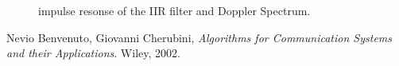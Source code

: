 \documentclass[a4paper, 12pt]{report}
\begin{document}

\begin{figure}[h!]
	\centering
	\caption{impulse resonse of the IIR filter and 	Doppler Spectrum.}\label{DS}
\end{figure}

\begin{thebibliography}{15}
	Nevio Benvenuto, Giovanni Cherubini,
	\textit{Algorithms for Communication Systems and their Applications}. 
	Wiley, 2002.
\end{thebibliography}
\end{document}
